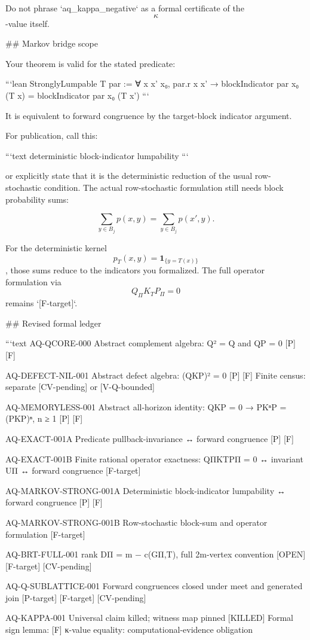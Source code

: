 Do not phrase `aq_kappa_negative` as a formal certificate of the $$\kappa$$-value itself.

## Markov bridge scope

Your theorem is valid for the stated predicate:

```lean
StronglyLumpable T par :=
  ∀ x x' x₀, par.r x x' →
    blockIndicator par x₀ (T x) =
    blockIndicator par x₀ (T x')
```

It is equivalent to forward congruence by the target-block indicator argument.

For publication, call this:

```text
deterministic block-indicator lumpability
```

or explicitly state that it is the deterministic reduction of the usual row-stochastic condition. The actual row-stochastic formulation still needs block probability sums:

$$
\sum_{y\in B_j}p(x,y)
=
\sum_{y\in B_j}p(x',y).
$$

For the deterministic kernel $$p_T(x,y)=\mathbf 1_{\{y=T(x)\}}$$, those sums reduce to the indicators you formalized. The full operator formulation via $$Q_\Pi K_TP_\Pi=0$$ remains `[F-target]`.

## Revised formal ledger

```text
AQ-QCORE-000
Abstract complement algebra: Q² = Q and QP = 0
[P] [F]

AQ-DEFECT-NIL-001
Abstract defect algebra: (QKP)² = 0
[P] [F]
Finite census: separate [CV-pending] or [V-Q-bounded]

AQ-MEMORYLESS-001
Abstract all-horizon identity:
QKP = 0 → PKⁿP = (PKP)ⁿ, n ≥ 1
[P] [F]

AQ-EXACT-001A
Predicate pullback-invariance ↔ forward congruence
[P] [F]

AQ-EXACT-001B
Finite rational operator exactness:
QΠKTPΠ = 0 ↔ invariant UΠ ↔ forward congruence
[F-target]

AQ-MARKOV-STRONG-001A
Deterministic block-indicator lumpability ↔ forward congruence
[P] [F]

AQ-MARKOV-STRONG-001B
Row-stochastic block-sum and operator formulation
[F-target]

AQ-BRT-FULL-001
rank DΠ = m − c(GΠ,T), full 2m-vertex convention
[OPEN] [F-target] [CV-pending]

AQ-Q-SUBLATTICE-001
Forward congruences closed under meet and generated join
[P-target] [F-target] [CV-pending]

AQ-KAPPA-001
Universal claim killed; witness map pinned
[KILLED]
Formal sign lemma: [F]
κ-value equality: computational-evidence obligation

